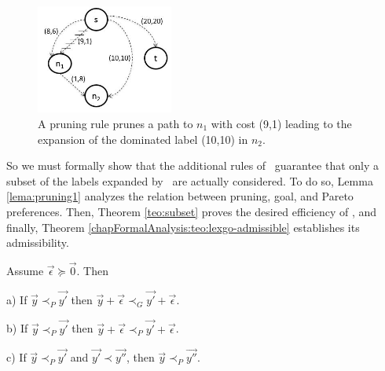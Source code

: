 \begin{figure}[!ht]
\centering
\includegraphics[width=0.4\textwidth]{Images/Chapter5/naive-pruning-example}
\caption{A pruning rule prunes a path to $n_1$ with cost (9,1) leading to the expansion of the dominated label (10,10) in $n_2$.}
\label{fig:5-1}
\end{figure} 

So we must formally show that the additional rules of \lexgo \ guarantee that only a subset of the labels expanded by \namoa \ are actually considered. To do so, Lemma \ref{lema:pruning1} analyzes the relation between pruning, goal, and Pareto preferences. Then, Theorem \ref{teo:subset} proves the desired efficiency of \lexgo, and finally, Theorem \ref{chapFormalAnalysis:teo:lexgo-admissible} establishes its admissibility.

\begin{lema}\label{lema:pruning1} 
Assume $\vec{\epsilon} \succeq \vec{0}$. Then

a) If $\vec{y} \prec_{P} \vec{y'}$  then $\vec{y} + \vec{\epsilon} \prec_{G} \vec{y'} + \vec{\epsilon}$.

b) If $\vec{y} \prec_{P} \vec{y'}$  then $\vec{y} + \vec{\epsilon} \prec_{P} \vec{y'} + \vec{\epsilon}$.

c) If $\vec{y} \prec_{P} \vec{y'}$ and $\vec{y'} \prec \vec{y''}$, then $\vec{y} \prec_{P} \vec{y''}.$

\end{lema}

